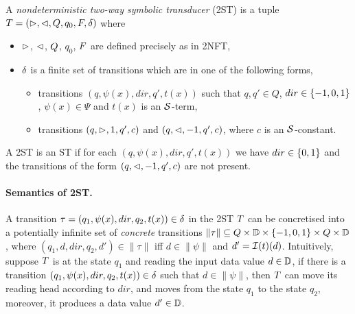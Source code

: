 \begin{definition}
    A \emph{nondeterministic two-way  symbolic \emph{transducer}} (2ST) is a tuple $T = (\vartriangleright, \vartriangleleft, Q, q_0, F, \delta)$ where  
\begin{itemize}
%
\item $\vartriangleright$, $\vartriangleleft$, $Q$, $q_0$, $F$ are defined precisely as in 2NFT, 
%
\item $\delta$ is a finite set of  transitions which are in one of the following forms,
\begin{itemize}
\item   transitions $(q, \psi(x), dir, q', t(x))$ such that $q, q' \in Q$, $dir \in \{-1, 0, 1\}$, $\psi(x) \in \Psi$ and
$t(x)$ is an $\mathcal{S}$-term, 
\item   transitions $(q, \vartriangleright, 1, q', c)$ and $(q, \vartriangleleft, -1, q', c)$, where $c$ is an $\mathcal{S}$-constant. 
\end{itemize}
\end{itemize}
A 2ST is an ST if for each $(q, \psi(x), dir, q', t(x))$ we have $dir \in \{0, 1\}$ and the transitions of the form $(q, \vartriangleleft, -1, q', c)$ are not present.
\end{definition}

\paragraph{Semantics of 2ST.}
A transition $\tau=(q_1,\psi(x), dir, q_2, t(x)) \in \delta$ in the 2ST $T$ can be concretised
into a potentially infinite set of \emph{concrete} transitions $\|\tau\| \subseteq Q \times \mathbb{D} \times \{-1, 0, 1\} \times Q \times \mathbb{D}$, where $(q_1, d, dir, q_2, d')  \in \|\tau\|$ iff $d \in \|\psi\|$ and $d' = \mathcal{I}(t)(d)$.
Intuitively, suppose $T$ is at the state $q_1$ and reading the input data value $d \in \mathbb{D}$,
if there is a transition $(q_1, \psi(x), dir, q_2, t(x) )\in \delta$ such that $d \in \|\psi\|$, then $T$ can move its reading head according to $dir$, and moves from the state
$q_1$ to the state $q_2$, moreover, it produces a data value $d' \in \mathbb{D}$.


